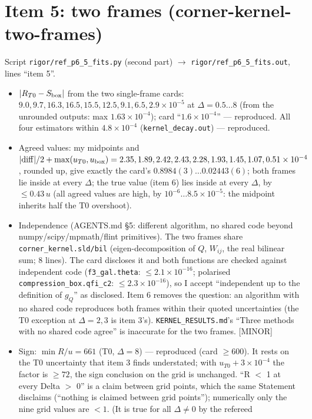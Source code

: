 \documentclass[11pt]{article}
\begin{document}
\section{Item 5: two frames (corner-kernel-two-frames)}
Script \texttt{rigor/ref\_p6\_5\_fits.py} (second part) $\to$ \texttt{rigor/ref\_p6\_5\_fits.out}, lines ``item 5''.
\begin{itemize}[leftmargin=*]
\item $|R_{T0}-S_{\rm box}|$ from the two single-frame cards: $9.0, 9.7, 16.3, 16.5, 15.5, 12.5, 9.1, 6.5, 2.9\times10^{-5}$ at
$\Delta=0.5\ldots8$ (from the unrounded outputs: max $1.63\times10^{-4}$); card ``$1.6\times10^{-4}$'' --- reproduced. All four
estimators within $4.8\times10^{-4}$ (\texttt{kernel\_decay.out}) --- reproduced.
\item Agreed values: my midpoints and $|{\rm diff}|/2+\max(u_{T0},u_{\rm box})=2.35, 1.89, 2.42, 2.43, 2.28, 1.93, 1.45, 1.07,
0.51\times10^{-4}$, rounded up, give exactly the card's $0.8984(3)\ldots0.02443(6)$; both frames lie inside at every $\Delta$;
the true value (item 6) lies inside at every $\Delta$, by $\le0.43\,u$ (all agreed values are high, by
$10^{-6}\ldots8.5\times10^{-5}$: the midpoint inherits half the T0 overshoot).
\item Independence (AGENTS.md \S5: different algorithm, no shared code beyond numpy/scipy/mpmath/flint primitives). The
two frames share \texttt{corner\_kernel.sld/bil} (eigen-decomposition of $Q$, $W_{ij}$, the real bilinear sum; 8 lines).
The card discloses it and both functions are checked against independent code (\texttt{f3\_gal.theta}: $\le2.1\times10^{-16}$;
polarised \texttt{compression\_box.qfi\_c2}: $\le2.3\times10^{-16}$), so I accept ``independent up to the definition of
$g_Q$'' as disclosed. Item 6 removes the question: an algorithm with no shared code reproduces both frames within their
quoted uncertainties (the T0 exception at $\Delta=2,3$ is item 3's). \texttt{KERNEL\_RESULTS.md}'s ``Three methods with no
shared code agree'' is inaccurate for the two frames. [MINOR]
\item Sign: $\min R/u=661$ (T0, $\Delta=8$) --- reproduced (card $\ge600$). It rests on the T0 uncertainty that item 3 finds
understated; with $u_{T0}+3\times10^{-4}$ the factor is $\ge72$, the sign conclusion on the grid is unchanged.
``R $<$ 1 at every Delta $>$ 0'' is a claim between grid points, which the same Statement disclaims (``nothing is claimed
between grid points''); numerically only the nine grid values are $<1$. (It is true for all $\Delta\ne0$ by the refereed

\end{itemize}
\end{document}
